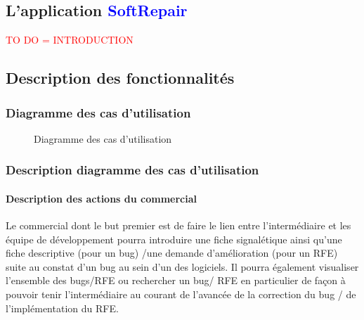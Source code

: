 \documentclass{article}[12pt]
\begin{document}
\subsection{L'application  \textcolor{blue}{SoftRepair}}
 \textcolor{red}{TO DO = INTRODUCTION}
 \newpage
\subsection{Description des fonctionnalités}
\subsubsection{Diagramme des cas d'utilisation}
\begin{figure}[H]
	\centering
	\caption{Diagramme des cas d'utilisation}
\end{figure}
\subsubsection{Description diagramme des cas d'utilisation}
\paragraph{Description des actions du commercial}
Le commercial dont le but premier est de faire le lien entre l'intermédiaire et les équipe de développement pourra introduire une fiche signalétique ainsi qu'une fiche descriptive (pour un bug) /une demande d'amélioration (pour un RFE) suite au constat d'un bug au sein d'un des logiciels. Il pourra également visualiser l'ensemble des bugs/RFE ou rechercher un bug/ RFE en particulier de façon à pouvoir tenir l'intermédiaire au courant de l'avancée de la correction du bug / de l'implémentation du RFE.
\end{document}
